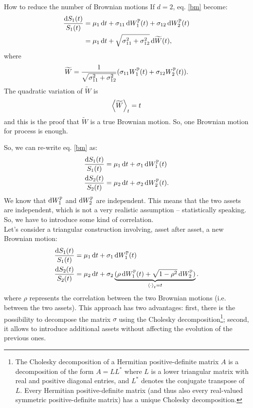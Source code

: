 \begin{example}{How to reduce the number of Brownian motions}{}{}
    If $d=2$, eq. \eqref{bm} become:
    \begin{align}
        \dfrac{\dd S_1(t)}{S_1(t)} &= \mu_1\,\dd t + \sigma_{11}\,\dd W_1^{\mathbb{P}}(t) + \sigma_{12}\,\dd W_2^{\mathbb{P}}(t) \\
        &=
        \mu_1\,\dd t + \sqrt{\sigma_{11}^2 + \sigma_{12}^2}\,\dd \widetilde{W}(t),
    \end{align}
    where
    \begin{equation}
        \widetilde{W} = \dfrac{1}{\sqrt{\sigma_{11}^2 + \sigma_{12}^2}}(\sigma_{11}W_1^{\mathbb{P}}(t) + \sigma_{12}W_2^{\mathbb{P}}(t)).
    \end{equation}
    The quadratic variation of $\widetilde{W}$ is
    \begin{equation}
        \expval{\widetilde{W}}_t = t
    \end{equation}
    and this is the proof that $\widetilde{W}$ is a true Brownian motion. So, one Brownian motion for process is enough.
\end{example}
So, we can re-write eq. \eqref{bm} as:
\begin{align}
    \dfrac{\dd S_1(t)}{S_1(t)} &= \mu_1\,\dd t + \sigma_{1}\,\dd W_1^{\mathbb{P}}(t) \\
    \dfrac{\dd S_2(t)}{S_2(t)} &= \mu_2\,\dd t + \sigma_{2}\,\dd W_2^{\mathbb{P}}(t).
\end{align}
We know that $\dd W_1^{\mathbb{P}}$ and $\dd W_2^{\mathbb{P}}$ are independent. This means that the two assets are independent, which is not a very realistic assumption -- statistically speaking. So, we have to introduce some kind of correlation.\\
Let's consider a triangular construction involving, asset after asset, a new Brownian motion:
\begin{align}
    \dfrac{\dd S_1(t)}{S_1(t)} &= \mu_1\,\dd t + \sigma_{1}\,\dd W_1^{\Pmeas}(t) \\
    \dfrac{\dd S_2(t)}{S_2(t)} &= \mu_2\,\dd t + \sigma_{2}\underbrace{(\rho\,\dd W_1^{\Pmeas}(t) + \sqrt{1-\rho^2}\,\dd W_2^{\Pmeas})}_{\expval{\cdot}_t=t}. %
\end{align}
where $\rho$ represents the correlation between the two Brownian motions (i.e. between the two assets). This approach has two advantages: first, there is the possibility to decompose the matrix $\sigma$ using the Cholesky decomposition\footnote{The Cholesky decomposition of a Hermitian positive-definite matrix $A$ is a decomposition of the form
$A=LL^*$ where $L$ is a lower triangular matrix with real and positive diagonal entries, and $L^*$ denotes the conjugate transpose of $L$. Every Hermitian positive-definite matrix (and thus also every real-valued symmetric positive-definite matrix) has a unique Cholesky decomposition.}; second, it allows to introduce additional assets without affecting the evolution of the previous ones.

